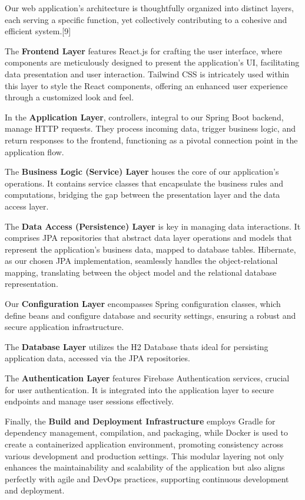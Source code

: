 Our web application's architecture is thoughtfully organized into distinct layers, each serving a specific function, yet collectively contributing to a cohesive and efficient system.[9]

The \textbf{Frontend Layer} features React.js for crafting the user interface, where components are meticulously designed to present the application's UI, facilitating data presentation and user interaction. Tailwind CSS is intricately used within this layer to style the React components, offering an enhanced user experience through a customized look and feel.

In the \textbf{Application Layer}, controllers, integral to our Spring Boot backend, manage HTTP requests. They process incoming data, trigger business logic, and return responses to the frontend, functioning as a pivotal connection point in the application flow.

The \textbf{Business Logic (Service) Layer} houses the core of our application's operations. It contains service classes that encapsulate the business rules and computations, bridging the gap between the presentation layer and the data access layer.

The \textbf{Data Access (Persistence) Layer} is key in managing data interactions. It comprises JPA repositories that abstract data layer operations and models that represent the application's business data, mapped to database tables. Hibernate, as our chosen JPA implementation, seamlessly handles the object-relational mapping, translating between the object model and the relational database representation.

Our \textbf{Configuration Layer} encompasses Spring configuration classes, which define beans and configure database and security settings, ensuring a robust and secure application infrastructure.

The \textbf{Database Layer} utilizes the H2 Database thats ideal for persisting application data, accessed via the JPA repositories.

The \textbf{Authentication Layer} features Firebase Authentication services, crucial for user authentication. It is integrated into the application layer to secure endpoints and manage user sessions effectively.

Finally, the \textbf{Build and Deployment Infrastructure} employs Gradle for dependency management, compilation, and packaging, while Docker is used to create a containerized application environment, promoting consistency across various development and production settings. This modular layering not only enhances the maintainability and scalability of the application but also aligns perfectly with agile and DevOps practices, supporting continuous development and deployment.
